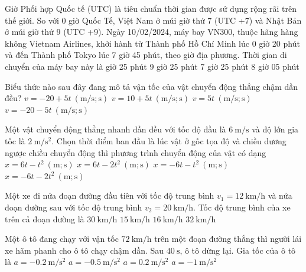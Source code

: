 \begin{ex}
	Giờ Phối hợp Quốc tế (UTC) là tiêu chuẩn thời gian được sử dụng rộng rãi trên thế giới. So với 0 giờ Quốc Tế, Việt Nam ở múi giờ thứ 7 (UTC +7) và Nhật Bản ở múi giờ thứ 9 (UTC +9). Ngày 10/02/2024, máy bay VN300, thuộc hãng hàng không Vietnam Airlines, khởi hành từ Thành phố Hồ Chí Minh lúc 0 giờ 20 phút và đến Thành phố Tokyo lúc 7 giờ 45 phút, theo giờ địa phương. Thời gian di chuyển của máy bay này là
	\choice
	{ giờ 25 phút}
	{ 9 giờ 25 phút}
	{7 giờ 25 phút}
	{8 giờ 05 phút}
	\loigiai{
	}
\end{ex}

\begin{ex}
	Biểu thức nào sau đây đang mô tả vận tốc của vật chuyển động thẳng chậm dần đều?
	\choice
	{\True $v=-20+5t\ \left(\si{\meter/\second}; \si{\second}\right)$}
	{$v=10+5t\ \left(\si{\meter/\second}; \si{\second}\right)$}
	{$v=5t\ \left(\si{\meter/\second}; \si{\second}\right)$}
	{$v=-20-5t\ \left(\si{\meter/\second}; \si{\second}\right)$}
	\loigiai{}
\end{ex}
\begin{ex}
	Một vật chuyển động thẳng nhanh dần đều với tốc độ đầu là $\SI{6}{\meter/\second}$ và độ lớn gia tốc là $\SI{2}{\meter/\second^2}$. Chọn thời điểm ban đầu là lúc vật ở gốc tọa độ và chiều dương ngược chiều chuyển động thì phương trình chuyển động của vật có dạng
	\choice
	{$x=6t-t^2\ \left(\si{\meter}; \si{\second}\right)$}
	{$x=6t-2t^2\ \left(\si{\meter}; \si{\second}\right)$}
	{\True $x=-6t-t^2\ \left(\si{\meter}; \si{\second}\right)$}
	{$x=-6t-2t^2\ \left(\si{\meter}; \si{\second}\right)$}
	\loigiai{}
\end{ex}
\begin{ex}
	Một xe đi nửa đoạn đường đầu tiên với tốc độ trung bình
	 $v_1=\SI{12}{\kilo\meter/\hour}$ và nửa đoạn đường	sau với tốc độ trung bình $v_2=\SI{20}{\kilo\meter/\hour}$. Tốc độ trung bình của xe trên cả đoạn đường là
	\choice
	{$\SI{30}{\kilo\meter/\hour}$}
	{\True $\SI{15}{\kilo\meter/\hour}$}
	{$\SI{16}{\kilo\meter/\hour}$}
	{$\SI{32}{\kilo\meter/\hour}$}
\end{ex}
\begin{ex}
	Một ô tô đang chạy với vận tốc $\SI{72}{\kilo\meter/\hour}$ trên một đoạn đường thắng thì người lái xe hãm phanh cho ô tô chạy chậm dần. Sau $\SI{40}{\second}$, ô tô dừng lại. Gia tốc của ô tô là
	\choice
	{$a=\SI{-0.2}{\meter/\second^2}$}
	{\True $a=\SI{-0.5}{\meter/\second^2}$}
	{$a=\SI{0.2}{\meter/\second^2}$}
	{$a=\SI{-1}{\meter/\second^2}$}
\end{ex}

